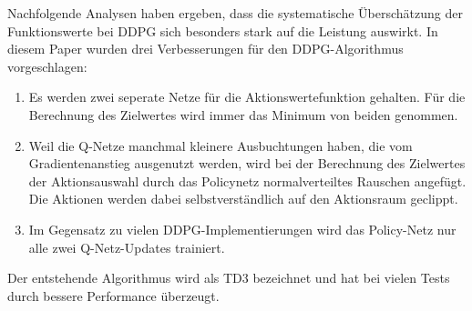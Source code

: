 Nachfolgende Analysen haben ergeben, dass die systematische Überschätzung der Funktionswerte bei DDPG sich besonders stark auf die Leistung auswirkt. \cite{DBLP:journals/corr/abs-1802-09477}
In diesem Paper wurden drei Verbesserungen für den DDPG-Algorithmus vorgeschlagen:
\begin{enumerate}
    \item Es werden zwei seperate Netze für die Aktionswertefunktion gehalten.
    Für die Berechnung des Zielwertes wird immer das Minimum von beiden genommen.
    \item Weil die Q-Netze manchmal kleinere Ausbuchtungen haben, die vom Gradientenanstieg ausgenutzt werden, wird bei der Berechnung des Zielwertes der Aktionsauswahl durch das Policynetz normalverteiltes Rauschen angefügt.
    Die Aktionen werden dabei selbstverständlich auf den Aktionsraum geclippt.
    \item Im Gegensatz zu vielen DDPG-Implementierungen wird das Policy-Netz nur alle zwei Q-Netz-Updates trainiert.
\end{enumerate}
Der entstehende Algorithmus wird als TD3 bezeichnet und hat bei vielen Tests durch bessere Performance überzeugt.

